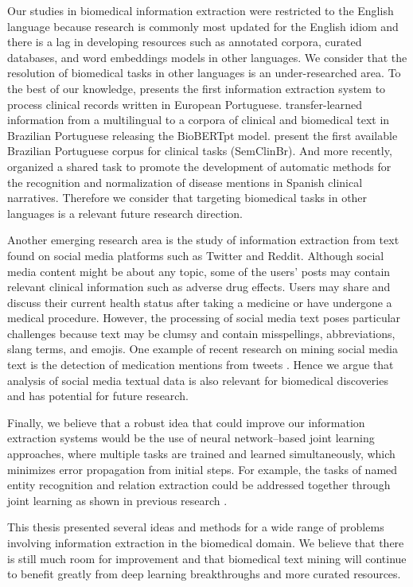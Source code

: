 Our studies in biomedical information extraction were restricted to the English language because research is commonly most updated for the English idiom and there is a lag in developing resources such as annotated corpora, curated databases, and word embeddings models in other languages.
We consider that the resolution of biomedical  tasks in other languages is an under-researched area.
To the best of our knowledge, \textcite{ferreira2011a} presents the first information extraction system to process clinical records written in European Portuguese.
\textcite{schneider2020a} transfer-learned information from a multilingual  to a corpora of clinical and biomedical text in Brazilian Portuguese releasing the BioBERTpt model.
\textcite{silvaeoliveira2022a} present the first available Brazilian Portuguese corpus for clinical  tasks (SemClinBr).
And more recently, \textcite{mirandaescalada2022a} organized a shared task to promote the development of automatic methods for the recognition and normalization of disease mentions in Spanish clinical narratives.
Therefore we consider that targeting biomedical  tasks in other languages is a relevant future research direction.

Another emerging research area is the study of information extraction from text found on social media platforms such as Twitter and Reddit.
Although social media content might be about any topic, some of the users' posts may contain relevant clinical information such as adverse drug effects.
Users may share and discuss their current health status after taking a medicine or have undergone a medical procedure.
However, the processing of social media text poses particular challenges because text may be clumsy and contain misspellings, abbreviations, slang terms, and emojis.
One example of recent research on mining social media text is the detection of medication mentions from tweets \parencite{weissenbacher2019a,weissenbacher2021b,zhang2022e}.
Hence we argue that analysis of social media textual data is also relevant for biomedical discoveries and has potential for future research.

Finally, we believe that a robust idea that could improve our information extraction systems would be the use of neural network--based joint learning approaches, where multiple  tasks are trained and learned simultaneously, which minimizes error propagation from initial steps.
For example, the tasks of named entity recognition and relation extraction could be addressed together through joint learning as shown in previous research \parencite{bekoulis2018a,luo2020a}.

This thesis presented several ideas and methods for a wide range of  problems involving information extraction in the biomedical domain.
We believe that there is still much room for improvement and that biomedical text mining will continue to benefit greatly from deep learning breakthroughs and more curated resources.
